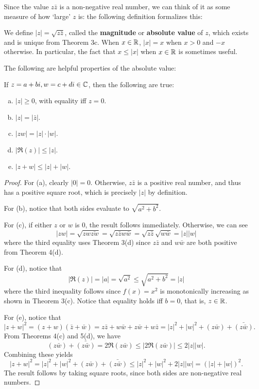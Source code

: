 Since the value $z\bar{z}$ is a non-negative real number, we can think of it as some measure of how `large' $z$ is: the following definition formalizes this:
\begin{definition}
We define $|z| = \sqrt{z\bar{z}}$, called the \textbf{magnitude} or \textbf{absolute value} of $z$, which exists and is unique from Theorem 3c. When $x \in \mathbb{R}$, $|x| = x$ when $x > 0$ and $-x$ otherwise. In particular, the fact that $x \le |x|$ when $x \in \mathbb{R}$ is sometimes useful.
\end{definition}

The following are helpful properties of the absolute value:
\begin{theorem}
If $z = a + bi, w = c + di \in \mathbb{C}$, then the following are true:
\begin{enumerate}[(a)]
\item $|z| \ge 0$, with equality iff $z = 0$.
\item $|z| = |\bar{z}|$.
\item $|zw| = |z| \cdot |w|$.
\item $|\Re(z)| \le |z|$.
\item $|z + w| \le |z| + |w|$.
\end{enumerate}
\begin{proof}
For (a), clearly $|0| = 0$. Otherwise, $z\bar{z}$ is a positive real number, and thus has a positive square root, which is precisely $|z|$ by definition.

For (b), notice that both sides evaluate to $\sqrt{a^2 + b^2}$.

For (c), if either $z$ or $w$ is 0, the result follows immediately. Otherwise, we can see
\[
	|zw| = \sqrt{zw \bar{zw}} = \sqrt{z\bar{z} w\bar{w}} = \sqrt{z\bar{z}} \sqrt{w\bar{w}} = |z||w|
\]
where the third equality uses Theorem 3(d) since $z\bar{z}$ and $w\bar{w}$ are both positive from Theorem 4(d).

For (d), notice that
\[
	|\Re(z)| = |a| = \sqrt{a^2} \le \sqrt{a^2 + b^2} = |z| 
\]
where the third inequality follows since $f(x) = x^2$ is monotonically increasing as shown in Theorem 3(c). Notice that equality holds iff $b = 0$, that is, $z \in \mathbb{R}$.

For (e), notice that
\[
	|z + w|^2 = (z + w)(\bar{z} + \bar{w}) = z\bar{z} + w\bar{w} + z\bar{w} + w\bar{z} = |z|^2 + |w|^2 + (z\bar{w}) + \bar{(z\bar{w})}.
\]
From Theorems 4(c) and 5(d), we have 
\[
(z\bar{w}) + \bar{(z\bar{w})} = 2\Re(z\bar{w}) \le |2\Re(z\bar{w})| \le 2|z||w|.
\]
Combining these yields
\[
	|z + w|^2 = |z|^2 + |w|^2 + (z\bar{w}) + \bar{(z\bar{w})} \le |z|^2 + |w|^2 + 2|z||w| = (|z| + |w|)^2.
\]
The result follows by taking square roots, since both sides are non-negative real numbers.
\end{proof}
\end{theorem}

